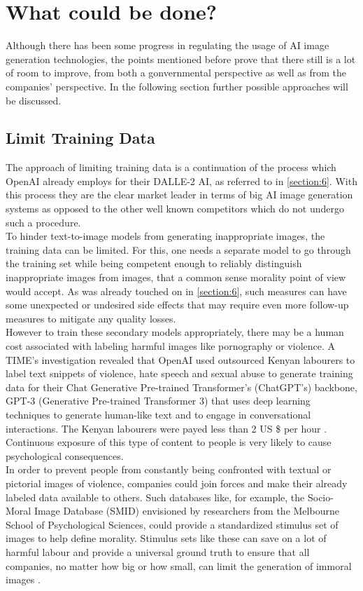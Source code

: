 \documentclass[10pt,twocolumn,twoside]{osajnl}
\begin{document}


\section{What could be done?}
Although there has been some progress in regulating the usage of AI image generation technologies, the points mentioned before prove 
that there still is a lot of room to improve, from both a gonvernmental perspective as well as from the companies' perspective.
In the following section further possible approaches will be discussed.


\subsection{Limit Training Data}
The approach of limiting training data is a continuation of the process which OpenAI already employs for their DALLE-2 AI, as referred to in \ref{section:6}.
With this process they are the clear market leader in terms of big AI image generation systems as opposed to the other well known competitors which do not undergo 
such a procedure. \\
To hinder text-to-image models from generating inappropriate images, the training data can be limited.
For this, one needs a separate model to go through the training set while being competent enough to reliably distinguish inappropriate images from images, that a common sense morality point of view would accept. 
As was already touched on in \ref{section:6}, such measures can have some unexpected or undesired side effects that may require even more follow-up measures to mitigate any quality losses. 
\\
However to train these secondary models appropriately, there may be a human cost associated with labeling harmful images like pornography or violence. 
A TIME's investigation revealed that OpenAI used outsourced Kenyan labourers to label text snippets of violence, hate speech 
and sexual abuse to generate training data for their Chat Generative Pre-trained Transformer's (ChatGPT’s) backbone, GPT-3 (Generative Pre-trained Transformer 3) 
that uses deep learning techniques to generate human-like text and to engage in conversational interactions. 
The Kenyan labourers were payed less than 2 US \$ per hour \cite{KenyaExclusive}. 
Continuous exposure of this type of content to people is very likely to cause psychological consequences. \\
In order to prevent people from constantly being confronted with textual or pictorial images of violence, companies could join forces and make their already labeled data available to others. 
Such databases like, for example, the Socio-Moral Image Database (SMID) envisioned by researchers from the Melbourne School of Psychological Sciences, could provide a standardized stimulus set of images to help define morality. 
Stimulus sets like these can save on a lot of harmful labour and provide a universal ground truth to ensure that all companies, no matter how big or how small, can limit the generation of immoral images \cite{Database}.
\end{document}
